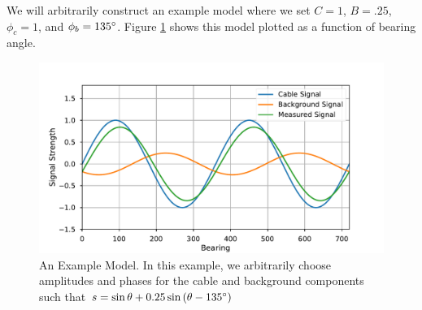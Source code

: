 \documentclass[paper=a4, fontsize=11pt]{scrartcl}
\numberwithin{equation}{section}		%
\numberwithin{figure}{section}			%
\numberwithin{table}{section}				%
\begin{document}
\begin{appendices}
We will arbitrarily construct an example model where we set $C=1$, $B=.25$, $\phi_c=1$, and $\phi_b=135\degree$. Figure \ref{fig:sigs_vs_bearing} shows this model plotted as a function of bearing angle.
\begin{figure}
  \caption{An Example Model.  In this example, we arbitrarily choose amplitudes and phases for the cable and background components such that  $s = \sin\theta + 0.25 \sin\left(\theta -135\degree\right)$
  }
  \label{fig:sigs_vs_bearing}
  \centering
  \includegraphics[width=1.0\textwidth]{figures/sigs_vs_bearing.pdf}
\end{figure}


\end{appendices}
\end{document}
